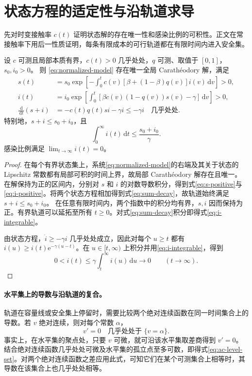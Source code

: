 \documentclass[lang=cn,a4paper,newtx]{elegantpaper}
\theoremstyle{plain}
\theoremstyle{definition}
\newcommand{\dd}{\,\mathrm d}
\newcommand{\e}{\mathrm e}
\begin{document}
\section{状态方程的适定性与沿轨道求导}
\label{app:wellposed}
\label{sec:wellposed}
先对时变接触率 $c(t)$ 证明状态解的存在唯一性和感染比例的可积性。正文在常接触率下用后一性质证明，每条有限成本的可行轨道都在有限时间内进入安全集。
\begin{theorem}[全局解与正性]
\label{thm:wellposed}
设 $c$ 可测且局部本质有界，$c(t)>0$ 几乎处处，$q$ 可测、取值于 $[0,1]$，$s_0,i_0>0$。
则 \eqref{eq:normalized-model} 存在唯一全局 Carath\'eodory 解，满足
\begin{align}
s(t)&=s_0\exp\left[-\int_0^t c(v)[\beta+(1-\beta)q(v)]i(v)\dd v\right]>0,
\label{eq:s-positive}\\
i(t)&=i_0\exp\left[\int_0^t[\beta c(v)(1-q(v))s(v)-\gamma]\dd v\right]>0,
\label{eq:i-positive}\\
\frac{\dd}{\dd t}(s+i)&=-c(t)q(t)si-\gamma i\le-\gamma i\quad\text{几乎处处}.
\label{eq:sum-decay}
\end{align}
特别地，$s+i\le s_0+i_0$，且
\begin{equation}
\int_0^\infty i(t)\dd t\le\frac{s_0+i_0}{\gamma}.
\label{eq:i-integrable}
\end{equation}
感染比例满足 $\lim_{t\to\infty}i(t)=0$。
\end{theorem}
\begin{proof}
在每个有界状态集上，系统\eqref{eq:normalized-model}的右端及其关于状态的 Lipschitz 常数都有局部可积的时间上界，故局部 Carath\'eodory 解存在且唯一。
在解保持为正的区间内，分别对 $s$ 和 $i$ 的对数导数积分，得到式\eqref{eq:s-positive}与\eqref{eq:i-positive}。将两个状态方程相加得到式\eqref{eq:sum-decay}，故轨道始终满足 $s+i\le s_0+i_0$。
在任意有限时间内，两个指数中的积分均有界，$s,i$ 因而保持为正。有界轨道可以延拓至所有 $t\ge0$。对式\eqref{eq:sum-decay}积分即得式\eqref{eq:i-integrable}。

由状态方程，$\dot i\ge-\gamma i$ 几乎处处成立，因此对每个 $u\ge t$ 都有
$i(u)\ge i(t)\e^{-\gamma(u-t)}$。在 $u\in[t,\infty)$ 上积分并用\eqref{eq:i-integrable}，得到
\[
 0<i(t)\le\gamma\int_t^\infty i(u)\dd u \longrightarrow 0
 \qquad (t\to\infty).
\]
\end{proof}

\paragraph{水平集上的导数与沿轨道的复合。}
轨道在容量线或安全集上停留时，需要比较两个绝对连续函数在同一时间集合上的导数。若 $v$ 绝对连续，则对每个常数 $\alpha$，
\begin{equation}
 v'=0\quad\text{几乎处处于 }\{v=\alpha\}.
 \label{eq:ac-level-set}
\end{equation}
事实上，在水平集的聚点处，只要 $v$ 可微，就可沿该水平集取差商得到 $v'=0$。结合绝对连续函数几乎处处可微及水平集的孤立点至多可数，即得式\eqref{eq:ac-level-set}\parencite[\S222K、\S225C(b)]{Fremlin2001Volume2}。对两个绝对连续函数之差应用此式，可知它们在某个可测集合上相等时，其导数在该集合上也几乎处处相等。
\end{document}

